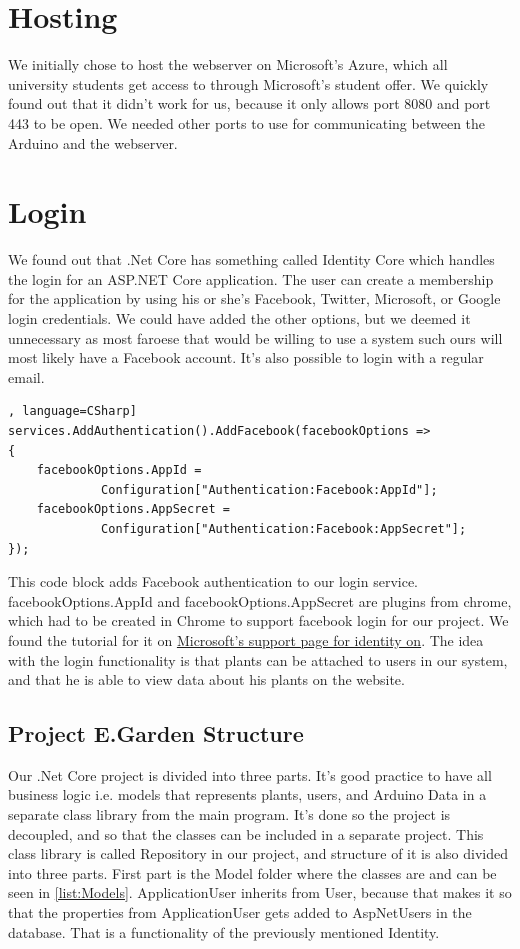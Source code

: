\documentclass[a4paper,12pt,twoside,openright,titlepage]{book}
\begin{document}
\section{Hosting}
We initially chose to host the webserver on Microsoft's Azure, which all university students get access to through Microsoft's student offer. We quickly found out that it didn't work for us, because it only allows port 8080 and port 443 to be open. We needed other ports to use for communicating between the Arduino and the webserver.

\section{Login}
We found out that .Net Core has something called Identity Core\cite{Identity} which handles the login for an ASP.NET Core application. The user can create a membership for the application by using his or she's  Facebook, Twitter, Microsoft, or Google login credentials. We could have added the other options, but we deemed it unnecessary as most faroese that would be willing to use a system such ours will most likely have a Facebook account. It's also possible to login with a regular email.

\begin{lstlisting}, language=CSharp] 
services.AddAuthentication().AddFacebook(facebookOptions =>
{
	facebookOptions.AppId =
			 Configuration["Authentication:Facebook:AppId"];
	facebookOptions.AppSecret =
			 Configuration["Authentication:Facebook:AppSecret"];
});
\end{lstlisting}
This code block adds Facebook authentication to our login service. facebookOptions.AppId and facebookOptions.AppSecret are plugins from chrome, which had to be created in Chrome to support facebook login for our project. We found the tutorial for it on \href{https://docs.microsoft.com/en-us/aspnet/core/security/authentication/social/facebook-logins?view=aspnetcore-2.2}{Microsoft's support page for identity on}. The idea with the login functionality is that plants can be attached to users in our system, and that he is able to view data about his plants on the website.


\subsection{Project E.Garden Structure}
Our .Net Core project is divided into three parts. It's good practice to have all business logic i.e. models that represents plants, users, and Arduino Data in a separate class library from the main program. It's done so the project is decoupled, and so that the classes can be included in a separate project. This class library is called Repository in our project, and structure of it is also divided into three parts. First part is the Model folder where the classes are and can be seen in \ref{list:Models}. ApplicationUser inherits from User, because that makes it so that the properties from ApplicationUser gets added to AspNetUsers in the database. That is a functionality of the previously mentioned Identity. 
\end{document}
